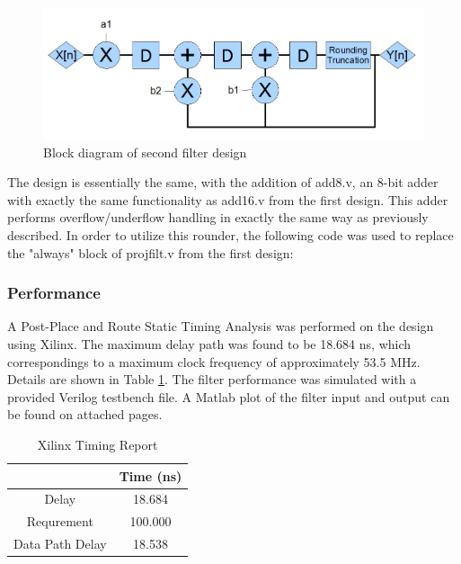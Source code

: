 \begin{figure}[h]
\begin{center}
\includegraphics[scale=0.5]{block_two.png}
\end{center}
\caption{Block diagram of second filter design}
\label{fig:block2}
\end{figure}


The design is essentially the same, with the addition of add8.v, an 8-bit adder with exactly the same functionality as add16.v from the first design. This adder performs overflow/underflow handling in exactly the same way as previously described. In order to utilize this rounder, the following code was used to replace the "always" block of projfilt.v from the first design:





\subsubsection*{Performance}
A Post-Place and Route Static Timing Analysis was performed on the design using Xilinx. The maximum delay path was found to be 18.684 ns, which correspondings to a maximum clock frequency of approximately 53.5 MHz. Details are shown in Table \ref{tab:timing2}. The filter performance was simulated with a provided Verilog testbench file. A Matlab plot of the filter input and output can be found on attached pages.

\begin{table}[h]
\caption{Xilinx Timing Report}
\begin{center}
\begin{tabular}{c|c}
           & Time (ns) \\
\hline
     Delay &     18.684 \\

Requrement &        100.000 \\

Data Path Delay &     18.538 \\
\end{tabular}  
\end{center}
\label{tab:timing2}
\end{table}


